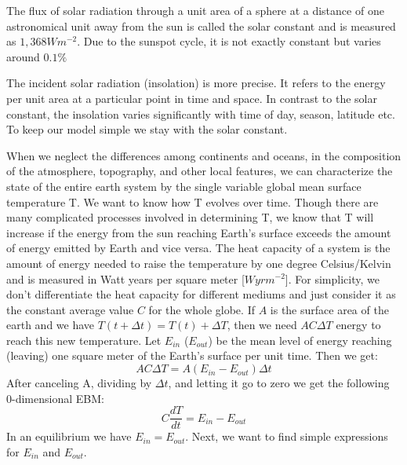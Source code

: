 \documentclass[%
thesis=student,%
coverpage=false,%
titlepage=false,%
headmarks=true, %
english,%
font=libertine, %
math=newpxtx, %
BCOR=5mm,%
coverBCOR=11mm%
]{tumbook}
\begin{document}
The flux of solar radiation through a unit area of a sphere at a distance of one astronomical unit away from the sun is called the solar constant and is measured as $1,368Wm^{-2}$. Due to the sunspot cycle, it is not exactly constant but varies around $0.1\%$

The incident solar radiation (insolation) is more precise. It refers to the energy per unit area at a particular point in time and space. In contrast to the solar constant, the insolation varies significantly with time of day, season, latitude etc. To keep our model simple we stay with the solar constant.

When we neglect the differences among continents and oceans, in the composition of the atmosphere, topography, and other local features, we can characterize the state of the entire earth system by the single variable global mean surface temperature T. We want to know how T evolves over time. Though there are many complicated processes involved in determining T, we know that T will increase if the energy from the sun reaching Earth's surface exceeds the amount of energy emitted by Earth and vice versa.
The heat capacity of a system is the amount of energy needed to raise the temperature by one degree Celsius/Kelvin and is measured in Watt years per square meter [$W yr m^{-2}$]. For simplicity, we don't differentiate the heat capacity for different mediums and just consider it as the constant average value $C$ for the whole globe. If $A$ is the surface area of the earth and we have $T(t+\Delta t) = T(t) + \Delta T$, then we need $AC\Delta T$ energy to reach this new temperature.  Let $E_{in}$  ($E_{out}$) be the mean level of energy reaching (leaving) one square meter of the Earth's surface per unit time. Then we get: 
\begin{equation}
AC\Delta T = A(E_{in} - E_{out})\Delta t
\end{equation}
After canceling A, dividing by $\Delta t$, and letting it go to zero we get the following 0-dimensional EBM: 
\begin{equation}
    C\frac{dT}{dt} = E_{in} - E_{out}
\end{equation}
In an equilibrium we have $E_{in} = E_{out}$. Next, we want to find simple expressions for $E_{in}$ and $E_{out}$.
\end{document}
